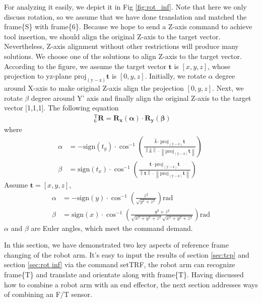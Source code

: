 \par
For analyzing it easily, we depict it in Fig \ref{fig:rot_inf}. Note that here we only discuss rotation, so we assume that we have done translation and matched the frame\{S\} with frame\{6\}. Because we hope to send a Z-axis command to achieve tool insertion, we should align the original Z-axis to the target vector. Nevertheless, Z-axis alignment without other restrictions will produce many solutions. We choose one of the solutions to align Z-axis to the target vector. According to the figure, we assume the target vector $\boldsymbol{t}$ is $\left[x,y,z\right]$, whose projection to yz-plane $\mathrm{proj_{(y-z)}}\boldsymbol{t}$ is $\left[0,y,z\right]$. Initially, we rotate $\alpha$ degree around X-axis to make original Z-axis align the projection $\left[0,y,z\right]$. Next, we rotate $\beta$ degree around Y' axis and finally align the original Z-axis to the target vector [1,1,1]. The following equation 
\begin{equation}
\begin{split}
\ \  _{\mathrm{6}}^{\mathrm{T}}\mathbf{R} = \mathbf{R_x(\alpha)} \cdot \mathbf{R_y(\beta)}
\end{split}
\end{equation}
where
\begin{equation}
\begin{split}
\alpha &= 
-\mathrm{sign}(t_y)\cdot \cos^{-1} \left(  \frac{\hat{k}						\cdot 		\mathrm{proj_{(y-z)}}\boldsymbol{t}				}
								 				{\left \| \hat{k} \right \| 	\cdot \left \| \mathrm{proj_{(y-z)}}\boldsymbol{t} \right \|} \right)\ \\
\beta  &= 
\mathrm{sign}(t_x)\cdot \cos^{-1} \left( \frac{\textbf{t}							\cdot 		\mathrm{proj_{(y-z)}}\boldsymbol{t}			}
								  			  {\left \| \textbf{t}\right \| 	\cdot \left \| \mathrm{proj_{(y-z)}}\boldsymbol{t} \right \|} \right)\ 
\end{split}
\end{equation}
Assume $\boldsymbol{t} = [x,y,z]$,
\begin{equation}
\begin{split}
\alpha &= 
-\mathrm{sign}(y)\cdot \cos^{-1}	\left( \frac{z^2}{\sqrt{y^2+z^2}} \right) \mathrm{rad}\\
\beta  &= 
\mathrm{sign}(x)\cdot \cos^{-1} \left( \frac{y^2+z^2}{\sqrt{x^2+y^2+z^2}\sqrt{x^2+y^2+z^2}} \right) \mathrm{rad}
\end{split}
\end{equation}
$\alpha$ and $\beta$ are Euler angles, which meet the command demand.
\par
In this section, we have demonstrated two key aspects of reference frame changing of the robot arm. It's easy to input the results of section \ref{sec:tcp} and section \ref{sec:rot inf} via the command setTRF, the robot arm can recognize frame\{T\} and translate and orientate along with frame\{T\}. Having discussed how to combine a robot arm with an end effector, the next section addresses ways of combining an F/T sensor.